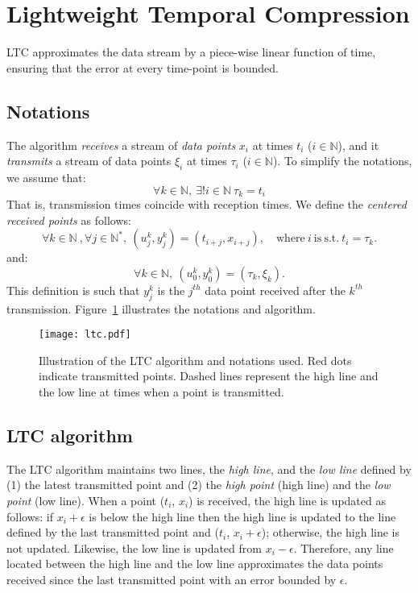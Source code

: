 \documentclass[10pt, conference, compsocconf]{IEEEtran}
\begin{document}
\section{Lightweight Temporal Compression}
\label{sec:ltc}

LTC approximates the data stream 
by a piece-wise linear function of time, ensuring that the error at 
every time-point is bounded.

\subsection{Notations}

The algorithm \emph{receives} a stream of \emph{data points} $x_i$
at times $t_i$ ($i \in \mathbb{N}$), and it \emph{transmits} a stream of data points $\xi_i$ 
at times $\tau_i$ ($i \in \mathbb{N}$). To simplify the notations, we assume that:
\begin{equation*}
\forall k \in \mathbb{N}, \  \exists ! i \in \mathbb{N} \  \tau_k = t_i
\end{equation*}
That is, transmission times coincide with reception times. 
We define the \emph{centered received points} as follows:
\begin{equation*}
\forall k \in \mathbb{N}\ , \forall j \in \mathbb{N^*},\ (u^k_j, y^k_j) = (t_{i+j}, x_{i+j}), \quad \mathrm{where\ }i\mathrm{\ is\ s.t.}\ t_i = \tau_k.
\end{equation*}
and:
\begin{equation*}
\forall k \in \mathbb{N},\  (u^k_0, y^k_0) = (\tau_k, \xi_k).
\end{equation*}
This definition is such that $y^k_j$ is the $j^{th}$ data point received
after the $k^{th}$ transmission.
Figure~\ref{fig:ltc} illustrates the notations and algorithm.  
\begin{figure}
\texttt{[image: ltc.pdf]}
\caption{Illustration of the LTC algorithm and notations used. Red dots indicate transmitted points. Dashed lines
represent the high line and the low line at times when a point is transmitted.}
\label{fig:ltc}
\end{figure}
\subsection{LTC algorithm}

The LTC algorithm maintains two lines, the \emph{high line}, and the 
\emph{low line} defined by (1) the latest transmitted point and (2) the 
\emph{high point} (high line) and the \emph{low point} (low line). When 
a point ($t_i$, $x_i$) is received, the high line is updated as 
follows: if $x_i+\epsilon$ is below the high line then the high line is 
updated to the line defined by the last transmitted point and ($t_i$, 
$x_i+\epsilon$); otherwise, the high line is not updated. Likewise, the low line 
is updated from $x_i-\epsilon$. Therefore, any line located between the 
high line and the low line approximates the data points received since 
the last transmitted point with an error bounded by $\epsilon$.
\end{document}

